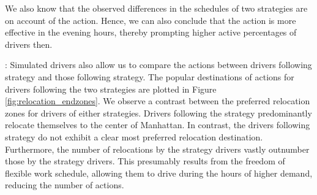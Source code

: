 We also know that the observed differences in the schedules of two strategies are on account of the {\relocate} action. Hence, we can also conclude that the {\relocate} action is more effective in the evening hours, thereby prompting higher active percentages of {\relocationflexible} drivers then.

: Simulated drivers also allow us to compare the {\relocate} actions between drivers following {\relocation} strategy and those following {\relocationflexible} strategy. The popular destinations of {\relocate} actions for drivers following the two strategies are plotted in Figure \ref{fig:relocation_endzones}. We observe a contrast between the preferred relocation zones for drivers of either strategies. Drivers following the {\relocation} strategy predominantly relocate themselves to the center of Manhattan. In contrast, the drivers following {\relocationflexible} strategy do not exhibit a clear most preferred relocation destination. Furthermore, the number of relocations by the {\relocation} strategy drivers vastly outnumber those by the {\relocationflexible} strategy drivers. This presumably results from the freedom of flexible work schedule, allowing them to drive during the hours of higher demand, reducing the number of {\relocate} actions. 

